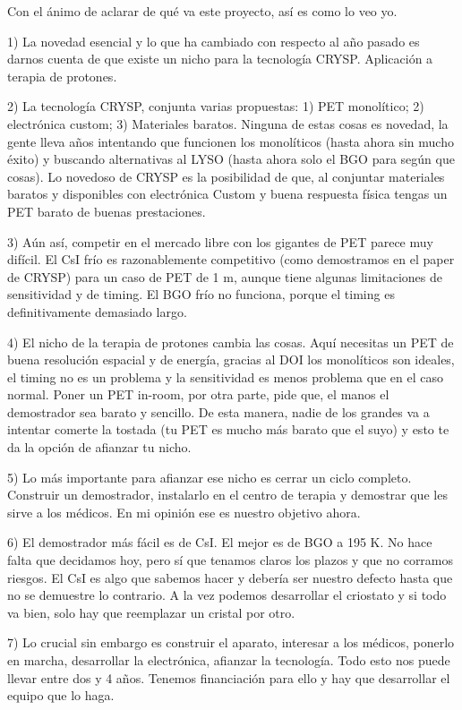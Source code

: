 Con el ánimo de aclarar de qué va este proyecto, así es como lo veo yo.

1) La novedad esencial y lo que ha cambiado con respecto al año pasado es darnos cuenta de que existe un nicho para la tecnología CRYSP. Aplicación a terapia de protones.

2) La tecnología CRYSP, conjunta varias propuestas: 1) PET monolítico; 2) electrónica custom; 3) Materiales baratos. Ninguna de estas cosas es novedad, la gente lleva años intentando que funcionen los monolíticos (hasta ahora sin mucho éxito) y buscando alternativas al LYSO (hasta ahora solo el BGO para según que cosas). Lo novedoso de CRYSP es la posibilidad de que, al conjuntar materiales baratos y disponibles con electrónica Custom y buena respuesta física tengas un PET barato de buenas prestaciones.

3) Aún así, competir en el mercado libre con los gigantes de PET parece muy difícil. El CsI frío es razonablemente competitivo (como demostramos en el paper de CRYSP) para un caso de PET de 1 m, aunque tiene algunas limitaciones de sensitividad y de timing. El BGO frío no funciona, porque el timing es definitivamente demasiado largo. 

4) El nicho de la terapia de protones cambia las cosas. Aquí necesitas un PET de buena resolución espacial y de energía, gracias al DOI los monolíticos son ideales, el timing no es un problema y la sensitividad es menos problema que en el caso normal. Poner un PET in-room, por otra parte, pide que, el manos el demostrador sea barato y sencillo. De esta manera, nadie de los grandes va a intentar comerte la tostada (tu PET es mucho más barato que el suyo) y esto te da la opción de afianzar tu nicho.

5) Lo más importante para afianzar ese nicho es cerrar un ciclo completo. Construir un demostrador, instalarlo en el centro de terapia y demostrar que les sirve a los médicos. En mi opinión ese es nuestro objetivo ahora. 

6) El demostrador más fácil es de CsI. El mejor es de BGO a 195 K. No hace falta que decidamos hoy, pero sí que tenamos claros los plazos y que no corramos riesgos. El CsI es algo que sabemos hacer y debería ser nuestro defecto hasta que no se demuestre lo contrario. A la vez podemos desarrollar el criostato y si todo va bien, solo hay que reemplazar un cristal por otro. 

7) Lo crucial sin embargo es construir el aparato, interesar a los médicos, ponerlo en marcha, desarrollar la electrónica, afianzar la tecnología. Todo esto nos puede llevar entre dos y 4 años. Tenemos financiación para ello y hay que desarrollar el equipo que lo haga.

